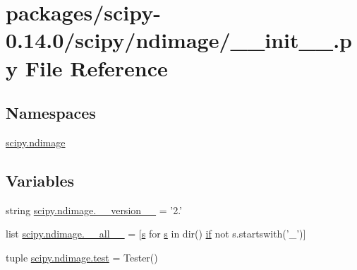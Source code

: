 \hypertarget{packages_2scipy-0_814_80_2scipy_2ndimage_2____init_____8py}{}\section{packages/scipy-\/0.14.0/scipy/ndimage/\+\_\+\+\_\+init\+\_\+\+\_\+.py File Reference}
\label{packages_2scipy-0_814_80_2scipy_2ndimage_2____init_____8py}
\subsection*{Namespaces}
\begin{DoxyCompactItemize}
\item 
 \hyperlink{namespacescipy_1_1ndimage}{scipy.\+ndimage}
\end{DoxyCompactItemize}
\subsection*{Variables}
\begin{DoxyCompactItemize}
\item 
string \hyperlink{namespacescipy_1_1ndimage_adaa87b576cea55ab6bcf02ea3a9d82aa}{scipy.\+ndimage.\+\_\+\+\_\+version\+\_\+\+\_\+} = '2.'
\item 
list \hyperlink{namespacescipy_1_1ndimage_a3157393e70fe2b865c39df03f3abab9b}{scipy.\+ndimage.\+\_\+\+\_\+all\+\_\+\+\_\+} = \mbox{[}\hyperlink{indexexpr_8h_ae024b0db549122b44c349ae28ec990dc}{s} for \hyperlink{indexexpr_8h_ae024b0db549122b44c349ae28ec990dc}{s} in dir() \hyperlink{minmax_8h_a30a0ee9fee303f01d9c5e6f669e0dfe9}{if} not s.\+startswith('\+\_\+')\mbox{]}
\item 
tuple \hyperlink{namespacescipy_1_1ndimage_a5e868031feea4e6814b1a39a42cc793a}{scipy.\+ndimage.\+test} = Tester()
\end{DoxyCompactItemize}

